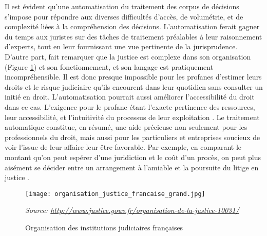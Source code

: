 Il est évident qu'une automatisation du traitement des corpus de décisions s'impose pour répondre aux diverses difficultés d'accès, de volumétrie, et de complexité liées à la compréhension des décisions. L'automatisation ferait gagner du temps aux juristes sur des tâches de traitement préalables à leur raisonnement d'experts, tout en leur fournissant une vue pertinente de la jurisprudence. D'autre part, \citet{cretin2014justicecomplexe} fait remarquer que la justice est complexe dans son organisation (Figure \ref{orgjusticefrance}) et son fonctionnement, et son langage est pratiquement incompréhensible. Il est donc presque impossible pour les profanes d'estimer leurs droits et le risque judiciaire qu'ils encourent dans leur quotidien sans consulter un initié en droit. L'automatisation pourrait aussi améliorer l'accessibilité du droit dans ce cas.  L'exigence pour le profane étant l'exacte pertinence des ressources, leur accessibilité, et l'intuitivité du processus de leur exploitation \citep{narazenko2017legalnlpintro}. Le traitement automatique constitue, en résumé, une aide précieuse non seulement pour les professionnels du droit, mais aussi pour les particuliers et entreprises soucieux de voir l'issue de leur affaire leur être favorable. Par exemple, en comparant le montant qu'on peut espérer d'une juridiction et le coût d'un procès, on peut plus aisément se décider entre un arrangement à l'amiable et la poursuite du litige en justice \citep{langlaischappe2009ecoresolutionlitige}. 

\begin{figure}
	\centering \texttt{[image: organisation\_justice\_francaise\_grand.jpg]}
	
	\textit{\scriptsize{Source: \url{http://www.justice.gouv.fr/organisation-de-la-justice-10031/}}}  
	\caption{Organisation des institutions judiciaires françaises} \label{orgjusticefrance}
\end{figure}

